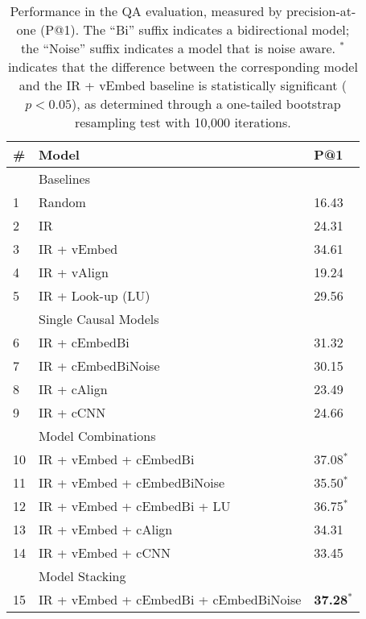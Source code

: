 
\begin{table}[t!]
\begin{center}
\begin{tabular}{lll}
\hline
\# & Model & P@1 \\ 
\hline
& Baselines & \\
\hline
1	&	Random 				& 16.43 	\\
2	&	IR					& 24.31	\\
3	&	IR + vEmbed 			& 34.61	\\
4	&	IR + vAlign			& 19.24	\\
5	&	IR + Look-up	 (LU)	& 29.56 	\\
\hline
& Single Causal Models 		& \\
\hline
6	&	IR + cEmbedBi       & 31.32\\
7	&	IR + cEmbedBiNoise  & 30.15 \\ 
8	&	IR + cAlign  		& 23.49 \\
9	&	IR + cCNN  			& 24.66	\\
\hline
& Model Combinations & \\
\hline
10	&	IR + vEmbed + cEmbedBi		& 37.08$^{*}$	\\ %
11	& 	IR + vEmbed + cEmbedBiNoise 	& 35.50$^*$	\\ %
12	&	IR + vEmbed + cEmbedBi + LU	& 36.75$^{*}$	\\ %
13	&	IR + vEmbed + cAlign		& 	34.31 	\\ %
14	&	IR + vEmbed + cCNN		& 	33.45 \\
\hline
& Model Stacking & \\
\hline
15	& 	IR + vEmbed + cEmbedBi + cEmbedBiNoise 	& {\bf 37.28$^{*}$}	\\ 

\end{tabular}
\caption{{Performance in the QA evaluation, measured by precision-at-one (P@1).  The ``Bi'' suffix indicates a bidirectional model; the ``Noise'' suffix indicates a model that is noise aware. $^*$  indicates that the difference between the corresponding model and the IR + vEmbed baseline is statistically significant ($p < 0.05$), %
as determined through a one-tailed bootstrap resampling test with 10,000 iterations. }} 
\label{tab:QA}
\end{center}
\end{table}


